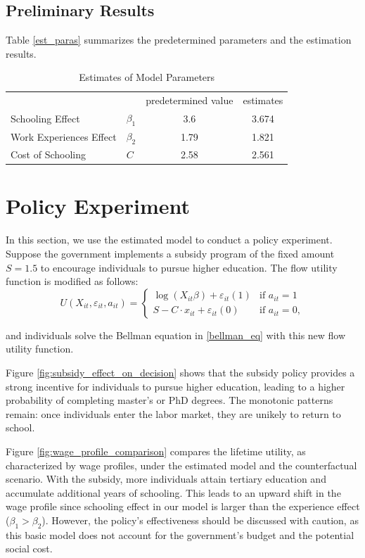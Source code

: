 \documentclass[a4paper, 12pt]{article}
\begin{document}
\subsection{Preliminary Results}
Table \eqref{est_paras} summarizes the predetermined parameters and the estimation results.
\begin{table}[hpbt]
\centering
\begin{tabular}{llcc}
\toprule
& & predetermined value & estimates \\
\cmidrule{2-4}
Schooling Effect & $\beta_1$ & 3.6 & 3.674 \\
\addlinespace
Work Experiences Effect & $\beta_2$ & 1.79  & 1.821 \\ 
\addlinespace
Cost of Schooling & $C$ & 2.58 & 2.561 \\
\bottomrule
\end{tabular}
\caption{Estimates of Model Parameters}
\label{est_paras}
\end{table}


\section{Policy Experiment}
In this section, we use the estimated model to conduct a policy experiment.
Suppose the government implements a subsidy program of the fixed amount $S=1.5$ to encourage individuals to pursue higher education.
The flow utility function is modified as follows:
\begin{equation}
U(X_{it},\varepsilon_{it}, a_{it}) =
\begin{cases}
    \log \left(X_{it}\beta\right) + \varepsilon_{it}(1) & \text{if } a_{it} = 1 \\
    S-C\cdot x_{it} + \varepsilon_{it}(0) & \text{if } a_{it} = 0,
\end{cases}
\end{equation}

and individuals solve the Bellman equation in \eqref{bellman_eq} with this new flow utility function.

Figure \eqref{fig:subsidy_effect_on_decision} shows that the subsidy policy provides a strong incentive 
for individuals to pursue higher education, leading to a higher probability of completing master's or PhD degrees.
The monotonic patterns remain: once individuals enter
the labor market, they are unikely to return to school.

Figure \eqref{fig:wage_profile_comparison} compares the lifetime utility, as characterized by wage profiles, under the estimated model and the counterfactual scenario.
With the subsidy, more individuals attain tertiary education and accumulate additional years of schooling.
This leads to an upward shift in the wage profile since schooling effect in our model is larger than the experience effect ($\beta_1>\beta_2$).
However, the policy's effectiveness should be discussed with caution, as this basic model does not account for the government's budget and the potential social cost.
\end{document}
